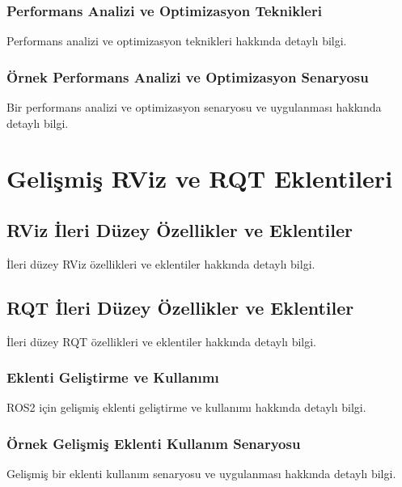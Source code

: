 \subsubsection{Performans Analizi ve Optimizasyon Teknikleri}
Performans analizi ve optimizasyon teknikleri hakkında detaylı bilgi.

\subsubsection{Örnek Performans Analizi ve Optimizasyon Senaryosu}
Bir performans analizi ve optimizasyon senaryosu ve uygulanması hakkında detaylı bilgi.

\section{Gelişmiş RViz ve RQT Eklentileri}
\subsection{RViz İleri Düzey Özellikler ve Eklentiler}
İleri düzey RViz özellikleri ve eklentiler hakkında detaylı bilgi.

\subsection{RQT İleri Düzey Özellikler ve Eklentiler}
İleri düzey RQT özellikleri ve eklentiler hakkında detaylı bilgi.

\subsubsection{Eklenti Geliştirme ve Kullanımı}
ROS2 için gelişmiş eklenti geliştirme ve kullanımı hakkında detaylı bilgi.

\subsubsection{Örnek Gelişmiş Eklenti Kullanım Senaryosu}
Gelişmiş bir eklenti kullanım senaryosu ve uygulanması hakkında detaylı bilgi.
